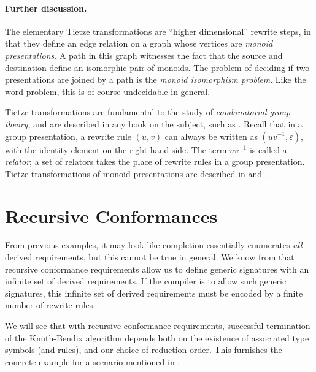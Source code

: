 \documentclass[../generics]{subfiles}
\begin{document}
\paragraph{Further discussion.}
The elementary Tietze transformations are ``higher dimensional'' rewrite steps, in that they define an edge relation on a graph whose vertices are \emph{monoid presentations}. A path in this graph witnesses the fact that the source and destination define an isomorphic pair of monoids. The problem of deciding if two presentations are joined by a path is the \emph{monoid isomorphism problem}. Like the word problem, this is of course undecidable in general.

Tietze transformations are fundamental to the study of \emph{combinatorial group theory}, and are described in any book on the subject, such as \cite{combinatorialgroup}. Recall that in a group presentation, a rewrite rule $(u, v)$ can always be written as $(uv^{-1},\varepsilon)$, with the identity element on the right hand side. The term $uv^{-1}$ is called a \emph{relator}; a set of relators takes the place of rewrite rules in a group presentation. Tietze transformations of monoid presentations are described in \cite{book2012string} and \cite{henry2021tietze}.

\section{Recursive Conformances}\label{recursive conformances redux}

From previous examples, it may look like completion essentially enumerates \emph{all} derived requirements, but this cannot be true in general. We know from  that recursive conformance requirements allow us to define generic signatures with an infinite set of derived requirements. If the compiler is to allow such generic signatures, this infinite set of derived requirements must be encoded by a finite number of rewrite rules.

We will see that with recursive conformance requirements, successful termination of the Knuth-Bendix algorithm depends both on the existence of associated type symbols (and rules), and our choice of reduction order. This furnishes the concrete example for a scenario mentioned in .
\end{document}
